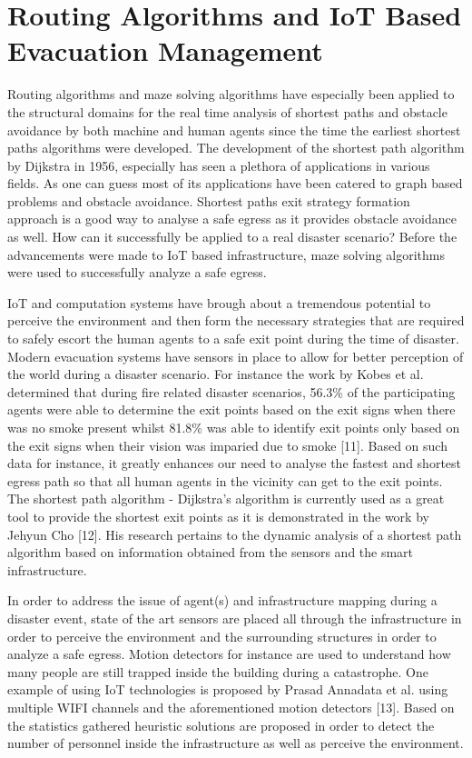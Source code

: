 \section{Routing Algorithms and IoT Based Evacuation Management}
\label{sec:pastwork:Routing Algorithms and IoT Based Evacuation Management}

Routing algorithms and maze solving algorithms have especially been applied to the structural domains for the real time analysis of shortest paths and obstacle avoidance by both machine and human agents since the time the earliest shortest paths algorithms were developed. The development of the shortest path algorithm by Dijkstra in 1956, especially has seen a plethora of applications in various fields. As one can guess most of its applications have been catered to graph based problems and obstacle avoidance. Shortest paths exit strategy formation approach is a good way to analyse a safe egress as it provides obstacle avoidance as well. How can it successfully be applied to a real disaster scenario? Before the advancements were made to IoT based infrastructure, maze solving algorithms were used to successfully analyze a safe egress. 

IoT and computation systems have brough about a tremendous potential to perceive the environment and then form the necessary strategies that are required to safely escort the human agents to a safe exit point during the time of disaster. Modern evacuation systems have sensors in place to allow for better perception of the world during a disaster scenario. For instance the work by Kobes et al. determined that during fire related disaster scenarios, 56.3\% of the participating agents were able to determine the exit points based on the exit signs when there was no smoke present whilst 81.8\% was able to identify exit points only based on the exit signs when their vision was imparied due to smoke [11]. Based on such data for instance, it greatly enhances our need to analyse the fastest and shortest egress path so that all human agents in the vicinity can get to the exit points. The shortest path algorithm - Dijkstra's algorithm is currently used as a great tool to provide the shortest exit points as it is demonstrated in the work by Jehyun Cho [12]. His research pertains to the dynamic analysis of a shortest path algorithm based on information obtained from the sensors and the smart infrastructure.  

In order to address the issue of agent(s) and infrastructure mapping during a disaster event, state of the art sensors are placed all through the infrastructure in order to perceive the environment and the surrounding structures in order to analyze a safe egress. Motion detectors for instance are used to understand how many people are still trapped inside the building during a catastrophe. One example of using IoT technologies is proposed by Prasad Annadata et al. using multiple WIFI channels and the aforementioned motion detectors [13]. Based on the statistics gathered heuristic solutions are proposed in order to detect the number of personnel inside the infrastructure as well as perceive the environment. 

